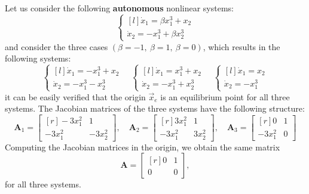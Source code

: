 \documentclass[12pt,a4paper,oneside]{book}
\begin{document}
\begin{onehalfspace}
\begin{example}
	Let us consider the following \textbf{autonomous} nonlinear systems:
	\begin{equation*}\label{eqlyap0}
		\left\lbrace 
		\begin{matrix*}[l]
			\dot{x}_1 = \beta x_1^3+x_2 \\[6pt]
			\dot{x}_2 = -x_1^3 + \beta x_2^3
		\end{matrix*}
		\right. 
	\end{equation*}
	and consider the three cases $\left( \beta = -1, \ \beta = 1, \ \beta = 
	0\right) $, which results in the following systems:
	\begin{equation*}\label{eqlyap5}
		\left\lbrace 
		\begin{matrix*}[l]
			\dot{x}_1 = -x_1^3+x_2 \\[6pt]
			\dot{x}_2 = -x_1^3-x_2^3
		\end{matrix*}
		\right. 
		\quad
		\left\lbrace
		\begin{matrix*}[l]
			\dot{x}_1 = x_1^3+x_2 \\[6pt]
			\dot{x}_2 = -x_1^3+x_2^3
		\end{matrix*}\right. 
		\quad
		\left\lbrace
		\begin{matrix*}[l]
			\dot{x}_1 = x_2 \\[6pt]
			\dot{x}_2 = -x_1^3
		\end{matrix*}\right. 
	\end{equation*}
	it can be easily verified that the origin $\vec{x}_e$ is an equilibrium 
	point for all three systems. The Jacobian matrices of the three systems 
	have the following structure:
	\begin{equation*}\label{eqlyap6}
		\mathbf{A}_1 =
		\begin{bmatrix*}[r]
			-3x_1^2 & 1 \\[6pt]
			-3x_1^2 & -3x_2^2
		\end{bmatrix*},
		\quad
		\mathbf{A}_2 =
		\begin{bmatrix*}[r]
			3x_1^2 & 1 \\[6pt]
			-3x_1^2 & 3x_2^2
		\end{bmatrix*},
		\quad
		\mathbf{A}_3 =
		\begin{bmatrix*}[r]
			0 & 1 \\[6pt]
			-3x_1^2 & 0
		\end{bmatrix*}
	\end{equation*}
	Computing the Jacobian matrices in the origin, we obtain the same matrix
	\begin{equation*}\label{eqlyap7}
		\mathbf{A} =
		\begin{bmatrix*}[r]
			0 & 1 \\[6pt]
			0 & 0
		\end{bmatrix*},
	\end{equation*}
	for all three systems.
	

\end{example}
\end{onehalfspace}
\end{document}
